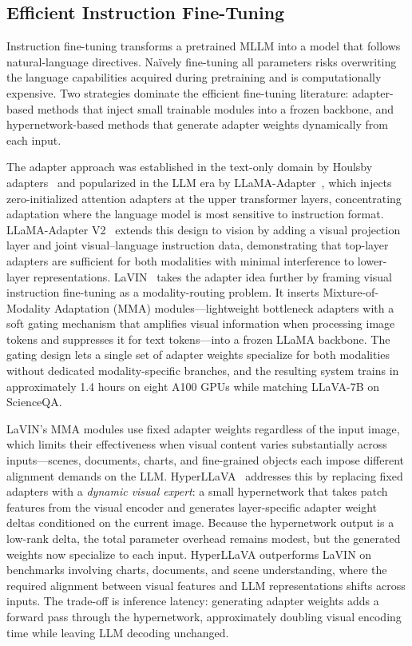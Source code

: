 \subsection{Efficient Instruction Fine-Tuning}
\label{subsec:efficient-sft}

Instruction fine-tuning transforms a pretrained MLLM into a model that follows natural-language directives. Na\"ively fine-tuning all parameters risks overwriting the language capabilities acquired during pretraining and is computationally expensive. Two strategies dominate the efficient fine-tuning literature: adapter-based methods that inject small trainable modules into a frozen backbone, and hypernetwork-based methods that generate adapter weights dynamically from each input.

The adapter approach was established in the text-only domain by Houlsby adapters~\cite{Houlsby201902110} and popularized in the LLM era by LLaMA-Adapter~\cite{Zhang202302301}, which injects zero-initialized attention adapters at the upper transformer layers, concentrating adaptation where the language model is most sensitive to instruction format. LLaMA-Adapter V2~\cite{Gao202303747} extends this design to vision by adding a visual projection layer and joint visual--language instruction data, demonstrating that top-layer adapters are sufficient for both modalities with minimal interference to lower-layer representations. LaVIN~\cite{Luo202315023} takes the adapter idea further by framing visual instruction fine-tuning as a modality-routing problem. It inserts Mixture-of-Modality Adaptation (MMA) modules---lightweight bottleneck adapters with a soft gating mechanism that amplifies visual information when processing image tokens and suppresses it for text tokens---into a frozen LLaMA backbone. The gating design lets a single set of adapter weights specialize for both modalities without dedicated modality-specific branches, and the resulting system trains in approximately 1.4 hours on eight A100 GPUs while matching LLaVA-7B on ScienceQA.

LaVIN's MMA modules use fixed adapter weights regardless of the input image, which limits their effectiveness when visual content varies substantially across inputs---scenes, documents, charts, and fine-grained objects each impose different alignment demands on the LLM. HyperLLaVA~\cite{Wen202403447} addresses this by replacing fixed adapters with a \emph{dynamic visual expert}: a small hypernetwork that takes patch features from the visual encoder and generates layer-specific adapter weight deltas conditioned on the current image. Because the hypernetwork output is a low-rank delta, the total parameter overhead remains modest, but the generated weights now specialize to each input. HyperLLaVA outperforms LaVIN on benchmarks involving charts, documents, and scene understanding, where the required alignment between visual features and LLM representations shifts across inputs. The trade-off is inference latency: generating adapter weights adds a forward pass through the hypernetwork, approximately doubling visual encoding time while leaving LLM decoding unchanged.

